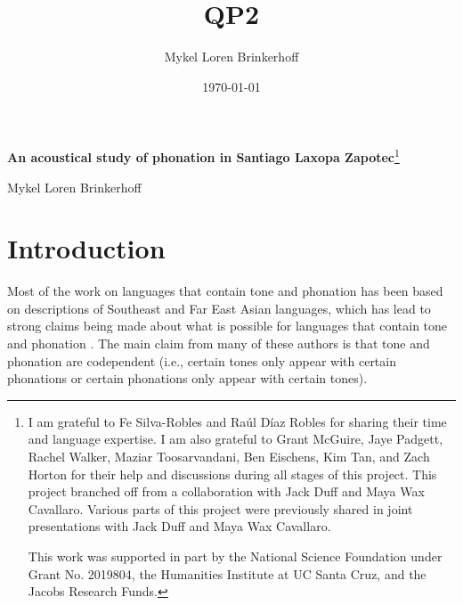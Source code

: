 \documentclass[12pt, letterpaper]{article}
\title{QP2}
\author{Mykel Loren Brinkerhoff}
\date{\today}
\begin{document}
	
	
	\onehalfspacing
	
\begin{center}
	{\Large \textbf{An acoustical study of phonation in Santiago Laxopa Zapotec}}\footnote{I am grateful to Fe Silva-Robles and  Raúl Díaz Robles for sharing their time and language expertise. I am also grateful to Grant McGuire,  Jaye Padgett, Rachel Walker, Maziar Toosarvandani, Ben Eischens, Kim Tan, and Zach Horton for their help and discussions during all stages of this project. This project branched off from a collaboration with Jack Duff and Maya Wax Cavallaro. Various parts of this project were previously shared in joint presentations with Jack Duff and Maya Wax Cavallaro.
	
	This work was supported in part by the National Science Foundation under Grant No. 2019804, the Humanities Institute at UC Santa Cruz, and the Jacobs Research Funds.}
	\vspace{6pt}

	Mykel Loren Brinkerhoff
\end{center}
\thispagestyle{fancy}



\section{Introduction} \label{sec:Introduction}

Most of the work on languages that contain tone and phonation has been based on descriptions of Southeast and Far East Asian languages, which has lead to strong claims being made about what is possible for languages that contain tone and phonation \citep{masicaDefiningLinguisticArea1976,thurgoodVietnameseTonogenesisRevising2002,yipTone2002,enfieldArealLinguisticsMainland2005,michaudComplexTonesEast2012,brunelleTonePhonationSoutheast2016}. The main claim from many of these authors is that tone and phonation are codependent (i.e., certain tones only appear with certain phonations or certain phonations only appear with certain tones).
\end{document}
